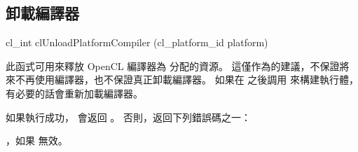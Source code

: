 \subsection{卸載編譯器}


\startCLFUNC
cl_int clUnloadPlatformCompiler (cl_platform_id platform)
\stopCLFUNC

此函式可用來釋放 OpenCL 編譯器為  分配的資源。
這僅作為的建議，不保證將來不再使用編譯器，也不保證真正卸載編譯器。
如果在  之後調用
 來構建執行體，
有必要的話會重新加載編譯器。

如果執行成功，  會返回 。
否則，返回下列錯誤碼之一：
\startigBase
\item {}，如果  無效。
\stopigBase

